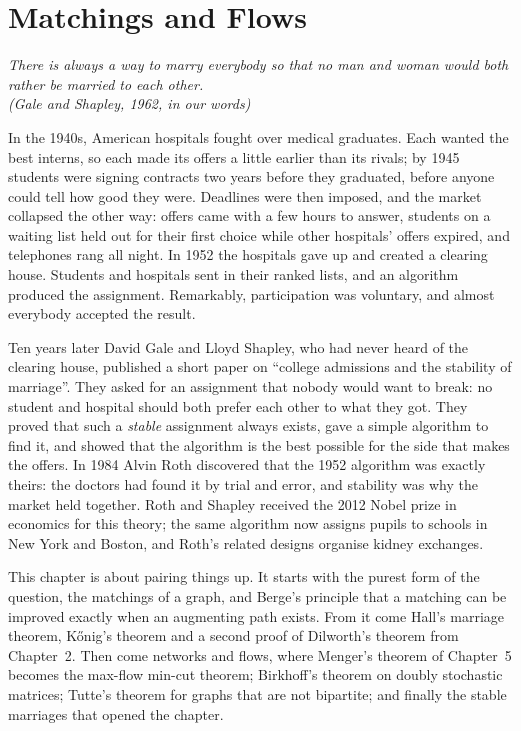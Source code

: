\chapter{Matchings and Flows}

\begin{center}\itshape
There is always a way to marry everybody so that no man and woman would both rather be married to each other.\\
\upshape(Gale and Shapley, 1962, in our words)
\end{center}

In the 1940s, American hospitals fought over medical graduates. Each wanted the best interns, so each made its offers a
little earlier than its rivals; by 1945 students were signing contracts two years before they graduated, before anyone could
tell how good they were. Deadlines were then imposed, and the market collapsed the other way: offers came with a few hours to
answer, students on a waiting list held out for their first choice while other hospitals' offers expired, and telephones rang
all night. In 1952 the hospitals gave up and created a clearing house. Students and hospitals sent in their ranked lists, and
an algorithm produced the assignment. Remarkably, participation was voluntary, and almost everybody accepted the result.

Ten years later David Gale and Lloyd Shapley, who had never heard of the clearing house, published a short paper on
``college admissions and the stability of marriage''. They asked for an assignment that nobody would want to break: no student
and hospital should both prefer each other to what they got. They proved that such a \emph{stable} assignment always exists, gave
a simple algorithm to find it, and showed that the algorithm is the best possible for the side that makes the offers. In 1984 Alvin
Roth discovered that the 1952 algorithm was exactly theirs: the doctors had found it by trial and error, and stability was why
the market held together. Roth and Shapley received the 2012 Nobel prize in economics for this theory; the same algorithm now
assigns pupils to schools in New York and Boston, and Roth's related designs organise kidney exchanges.

This chapter is about pairing things up. It starts with the purest form of the question, the matchings of a graph, and
Berge's principle that a matching can be improved exactly when an augmenting path exists. From it come Hall's marriage
theorem, K\H onig's theorem and a second proof of Dilworth's theorem from Chapter~2. Then come networks and flows, where
Menger's theorem of Chapter~5 becomes the max-flow min-cut theorem; Birkhoff's theorem on doubly stochastic matrices; Tutte's
theorem for graphs that are not bipartite; and finally the stable marriages that opened the chapter.

